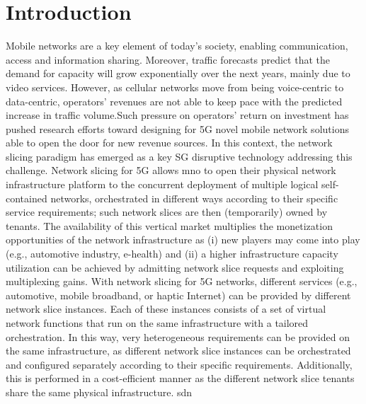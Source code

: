 \documentclass{article}
\begin{document}
\tableofcontents
\newpage
\printglossaries
\newpage


\section{Introduction}
Mobile networks are a key element of today's society, enabling communication, access
and information sharing. Moreover, traffic forecasts predict that the
demand for capacity will grow exponentially over the next years, mainly due to
video services. However, as cellular networks move from being voice-centric to
data-centric, operators' revenues are not able to keep pace with the predicted
increase in traffic volume.Such pressure on operators' return on investment has
pushed research efforts toward designing for 5G novel mobile network solutions
able to open the door for new revenue sources. In this context, the network
slicing paradigm has emerged as a key SG disruptive technology addressing this
challenge.
Network slicing for 5G allows \gls{mno} to open
their physical network infrastructure platform to the concurrent deployment
of multiple logical self-contained networks, orchestrated in different ways according
to their specific service requirements; such network slices are then
(temporarily) owned by tenants. The availability of this vertical market multiplies
the monetization opportunities of the network infrastructure as (i) new
players may come into play (e.g., automotive industry, e-health) and (ii) a higher
infrastructure capacity utilization can be achieved by admitting network slice
requests and exploiting multiplexing gains.
With network slicing for 5G networks, different services (e.g., automotive,
mobile broadband, or haptic Internet) can be provided by different network slice
instances. Each of these instances consists of a set of virtual network functions
that run on the same infrastructure with a tailored orchestration. In this way,
very heterogeneous requirements can be provided on the same infrastructure, as
different network slice instances can be orchestrated and configured separately
according to their specific requirements. Additionally, this is performed in a
cost-efficient manner as the different network slice tenants share the same
physical infrastructure. \gls{sdn}
\newpage
\end{document}
